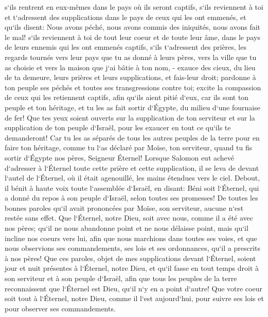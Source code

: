 \verse s`ils rentrent en eux-mêmes dans le pays où ils seront captifs, s`ils reviennent à toi et t`adressent des supplications dans le pays de ceux qui les ont emmenés, et qu`ils disent: Nous avons péché, nous avons commis des iniquités, nous avons fait le mal! 
\verse s`ils reviennent à toi de tout leur coeur et de toute leur âme, dans le pays de leurs ennemis qui les ont emmenés captifs, s`ils t`adressent des prières, les regards tournés vers leur pays que tu as donné à leurs pères, vers la ville que tu as choisie et vers la maison que j`ai bâtie à ton nom, - 
\verse exauce des cieux, du lieu de ta demeure, leurs prières et leurs supplications, et fais-leur droit; 
\verse pardonne à ton peuple ses péchés et toutes ses transgressions contre toi; excite la compassion de ceux qui les retiennent captifs, afin qu`ils aient pitié d`eux, 
\verse car ils sont ton peuple et ton héritage, et tu les as fait sortir d`Égypte, du milieu d`une fournaise de fer! 
\verse Que tes yeux soient ouverts sur la supplication de ton serviteur et sur la supplication de ton peuple d`Israël, pour les exaucer en tout ce qu`ils te demanderont! 
\verse Car tu les as séparés de tous les autres peuples de la terre pour en faire ton héritage, comme tu l`as déclaré par Moïse, ton serviteur, quand tu fis sortir d`Égypte nos pères, Seigneur Éternel! 
\verse Lorsque Salomon eut achevé d`adresser à l`Éternel toute cette prière et cette supplication, il se leva de devant l`autel de l`Éternel, où il était agenouillé, les mains étendues vers le ciel. 
\verse Debout, il bénit à haute voix toute l`assemblée d`Israël, en disant: 
\verse Béni soit l`Éternel, qui a donné du repos à son peuple d`Israël, selon toutes ses promesses! De toutes les bonnes paroles qu`il avait prononcées par Moïse, son serviteur, aucune n`est restée sans effet. 
\verse Que l`Éternel, notre Dieu, soit avec nous, comme il a été avec nos pères; qu`il ne nous abandonne point et ne nous délaisse point, 
\verse mais qu`il incline nos coeurs vers lui, afin que nous marchions dans toutes ses voies, et que nous observions ses commandements, ses lois et ses ordonnances, qu`il a prescrits à nos pères! 
\verse Que ces paroles, objet de mes supplications devant l`Éternel, soient jour et nuit présentes à l`Éternel, notre Dieu, et qu`il fasse en tout temps droit à son serviteur et à son peuple d`Israël, 
\verse afin que tous les peuples de la terre reconnaissent que l`Éternel est Dieu, qu`il n`y en a point d`autre! 
\verse Que votre coeur soit tout à l`Éternel, notre Dieu, comme il l`est aujourd`hui, pour suivre ses lois et pour observer ses commandements. 
